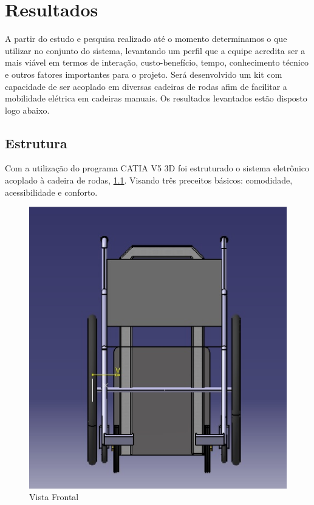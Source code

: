 \chapter[Resultados]{Resultados}

A partir do estudo e pesquisa realizado até o momento determinamos o que utilizar no conjunto do sistema, levantando um perfil que a equipe acredita ser a mais viável em termos de interação, custo-benefício, tempo, conhecimento técnico e outros fatores importantes para o projeto. Será desenvolvido um kit com capacidade de ser acoplado em diversas cadeiras de rodas afim de facilitar a mobilidade elétrica em cadeiras manuais. Os resultados levantados estão disposto logo abaixo.

\section{Estrutura}

Com a utilização do programa CATIA V5 3D foi estruturado o sistema eletrônico acoplado à cadeira de rodas, \ref{fig:frontal}. Visando três preceitos básicos: comodidade, acessibilidade e conforto.

\begin{figure}[!htb]
\centering
\includegraphics[keepaspectratio=true,scale=0.4]{figuras/estrutura/vista_frontal}
\caption{Vista Frontal}
\label{fig:frontal}
\end{figure}

